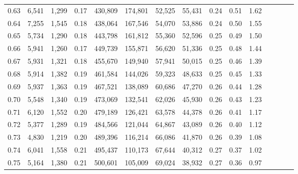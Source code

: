 \begin{tabular}{rrrcrrrrrrrrrrr}
0.63 &   6,541 &   1,299 &                                       0.17 &  430,809 &  174,801 &   52,525 &   55,431 &  0.24 &  0.51 &                         1.62 \\
0.64 &   7,255 &   1,545 &                                       0.18 &  438,064 &  167,546 &   54,070 &   53,886 &  0.24 &  0.50 &                         1.55 \\
0.65 &   5,734 &   1,290 &                                       0.18 &  443,798 &  161,812 &   55,360 &   52,596 &  0.25 &  0.49 &                         1.50 \\
0.66 &   5,941 &   1,260 &                                       0.17 &  449,739 &  155,871 &   56,620 &   51,336 &  0.25 &  0.48 &                         1.44 \\
0.67 &   5,931 &   1,321 &                                       0.18 &  455,670 &  149,940 &   57,941 &   50,015 &  0.25 &  0.46 &                         1.39 \\
0.68 &   5,914 &   1,382 &                                       0.19 &  461,584 &  144,026 &   59,323 &   48,633 &  0.25 &  0.45 &                         1.33 \\
0.69 &   5,937 &   1,363 &                                       0.19 &  467,521 &  138,089 &   60,686 &   47,270 &  0.26 &  0.44 &                         1.28 \\
0.70 &   5,548 &   1,340 &                                       0.19 &  473,069 &  132,541 &   62,026 &   45,930 &  0.26 &  0.43 &                         1.23 \\
0.71 &   6,120 &   1,552 &                                       0.20 &  479,189 &  126,421 &   63,578 &   44,378 &  0.26 &  0.41 &                         1.17 \\
0.72 &   5,377 &   1,289 &                                       0.19 &  484,566 &  121,044 &   64,867 &   43,089 &  0.26 &  0.40 &                         1.12 \\
0.73 &   4,830 &   1,219 &                                       0.20 &  489,396 &  116,214 &   66,086 &   41,870 &  0.26 &  0.39 &                         1.08 \\
0.74 &   6,041 &   1,558 &                                       0.21 &  495,437 &  110,173 &   67,644 &   40,312 &  0.27 &  0.37 &                         1.02 \\
0.75 &   5,164 &   1,380 &                                       0.21 &  500,601 &  105,009 &   69,024 &   38,932 &  0.27 &  0.36 &                         0.97 \\

\end{tabular}
